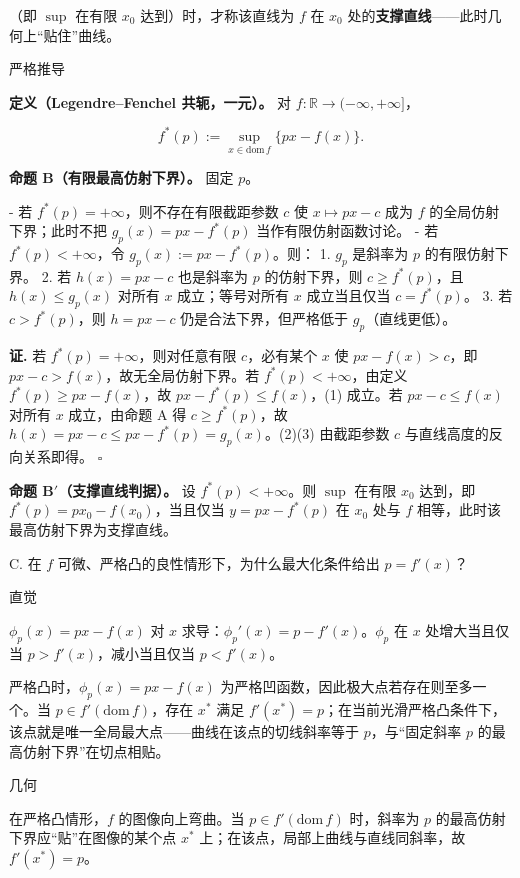 \documentclass[
    lang=cn,
    color=blue,
    mode=fancy,
    thmcnt=section,
    scheme=chinese
]{elegantbook}
\begin{document}
（即 $\sup$ 在有限 $x_0$ 达到）时，才称该直线为 $f$ 在 $x_0$ 处的\textbf{支撑直线}——此时几何上“贴住”曲线。

严格推导

\textbf{定义（Legendre–Fenchel 共轭，一元）。} 对 $f : \mathbb{R} \to (-\infty, +\infty]$，

\[
f^*(p) := \sup_{x \in \mathrm{dom}\, f} \bigl\{ px - f(x) \bigr\}.
\]

\textbf{命题 B（有限最高仿射下界）。} 固定 $p$。

- 若 $f^*(p) = +\infty$，则不存在有限截距参数 $c$ 使 $x\mapsto px-c$ 成为 $f$ 的全局仿射下界；此时不把 $g_p(x)=px-f^*(p)$ 当作有限仿射函数讨论。
- 若 $f^*(p) < +\infty$，令 $g_p(x) := px - f^*(p)$。则：
  1. $g_p$ 是斜率为 $p$ 的有限仿射下界。
  2. 若 $h(x)=px-c$ 也是斜率为 $p$ 的仿射下界，则 $c \ge f^*(p)$，且 $h(x) \le g_p(x)$ 对所有 $x$ 成立；等号对所有 $x$ 成立当且仅当 $c = f^*(p)$。
  3. 若 $c > f^*(p)$，则 $h = px - c$ 仍是合法下界，但严格低于 $g_p$（直线更低）。

\textbf{证.} 若 $f^*(p)=+\infty$，则对任意有限 $c$，必有某个 $x$ 使 $px-f(x)>c$，即 $px-c>f(x)$，故无全局仿射下界。若 $f^*(p)<+\infty$，由定义 $f^*(p) \ge px - f(x)$，故 $px - f^*(p) \le f(x)$，(1) 成立。若 $px - c \le f(x)$ 对所有 $x$ 成立，由命题 A 得 $c \ge f^*(p)$，故 $h(x)=px-c \le px-f^*(p)=g_p(x)$。(2)(3) 由截距参数 $c$ 与直线高度的反向关系即得。 $\square$

\textbf{命题 B$'$（支撑直线判据）。} 设 $f^*(p)<+\infty$。则 $\sup$ 在有限 $x_0$ 达到，即 $f^*(p) = p x_0 - f(x_0)$，当且仅当 $y = px - f^*(p)$ 在 $x_0$ 处与 $f$ 相等，此时该最高仿射下界为支撑直线。

\par
C. 在 $f$ 可微、严格凸的良性情形下，为什么最大化条件给出 $p = f'(x)$？

直觉

$\phi_p(x) = px - f(x)$ 对 $x$ 求导：$\phi_p'(x) = p - f'(x)$。$\phi_p$ 在 $x$ 处增大当且仅当 $p > f'(x)$，减小当且仅当 $p < f'(x)$。

严格凸时，$\phi_p(x)=px-f(x)$ 为严格凹函数，因此极大点若存在则至多一个。当 $p\in f'(\mathrm{dom}\, f)$，存在 $x^*$ 满足 $f'(x^*)=p$；在当前光滑严格凸条件下，该点就是唯一全局最大点——曲线在该点的切线斜率等于 $p$，与“固定斜率 $p$ 的最高仿射下界”在切点相贴。

几何

在严格凸情形，$f$ 的图像向上弯曲。当 $p\in f'(\mathrm{dom}\, f)$ 时，斜率为 $p$ 的最高仿射下界应“贴”在图像的某个点 $x^*$ 上；在该点，局部上曲线与直线同斜率，故 $f'(x^*) = p$。
\end{document}
